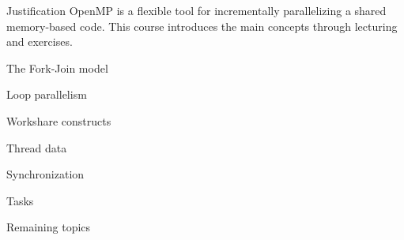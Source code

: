 \documentclass[10pt]{beamer}
\begin{document}
\def\instructor{Eijkhout}
\def\course{OpenMP tutorial}
\def\title{\course}
\def\year{2023}
\def\qrcode{qrvol2}
\author{Victor Eijkhout}

\maketitle

\begin{frame}{Justification}
  OpenMP is a flexible tool for incrementally parallelizing a shared
  memory-based code.
  This course introduces the main concepts
  through lecturing and exercises.
\end{frame}

 {The Fork-Join model}


 {Loop parallelism}


 {Workshare constructs}


 {Thread data}


 {Synchronization}


 {Tasks}


 {Remaining topics}

\end{document}
